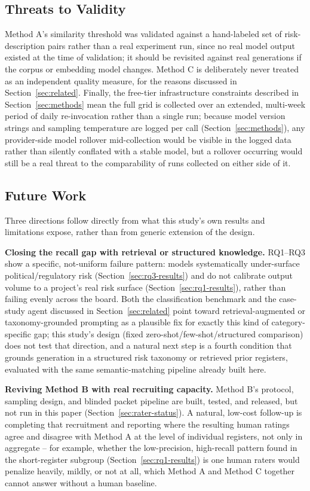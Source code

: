 \documentclass[conference]{IEEEtran}
\begin{document}
\subsection{Threats to Validity}
Method A's similarity threshold was validated against a hand-labeled set of
risk-description pairs rather than a real experiment run, since no real
model output existed at the time of validation; it should be revisited
against real generations if the corpus or embedding model changes. Method C
is deliberately never treated as an independent quality measure, for the
reasons discussed in
Section~\ref{sec:related}. Finally, the free-tier infrastructure
constraints described in Section~\ref{sec:methods} mean the full grid is
collected over an extended, multi-week period of daily re-invocation rather
than a single run; because model version strings and sampling temperature
are logged per call (Section~\ref{sec:methods}), any provider-side model
rollover mid-collection would be visible in the logged data rather than
silently conflated with a stable model, but a rollover occurring would
still be a real threat to the comparability of runs collected on either
side of it.

\subsection{Future Work}
\label{sec:future-work}
Three directions follow directly from what this study's own results and
limitations expose, rather than from generic extension of the design.

\textbf{Closing the recall gap with retrieval or structured knowledge.}
RQ1--RQ3 show a specific, not-uniform failure pattern: models
systematically under-surface political/regulatory risk
(Section~\ref{sec:rq3-results}) and do not calibrate output volume to a
project's real risk surface (Section~\ref{sec:rq1-results}), rather than
failing evenly across the board. Both the classification benchmark and the
case-study agent discussed in Section~\ref{sec:related} point toward
retrieval-augmented or taxonomy-grounded prompting as a plausible fix for
exactly this kind of category-specific gap; this study's design (fixed
zero-shot/few-shot/structured comparison) does not test that direction, and
a natural next step is a fourth condition that grounds generation in a
structured risk taxonomy or retrieved prior registers, evaluated with the
same semantic-matching pipeline already built here.

\textbf{Reviving Method B with real recruiting capacity.} Method B's
protocol, sampling design, and blinded packet pipeline are built, tested,
and released, but not run in this paper (Section~\ref{sec:rater-status}).
A natural, low-cost follow-up is completing that recruitment and reporting
where the resulting human ratings agree and disagree with Method A at the
level of individual registers, not only in aggregate -- for example,
whether the low-precision, high-recall pattern found in the short-register
subgroup (Section~\ref{sec:rq1-results}) is one human raters would penalize
heavily, mildly, or not at all, which Method A and Method C together
cannot answer without a human baseline.
\end{document}
